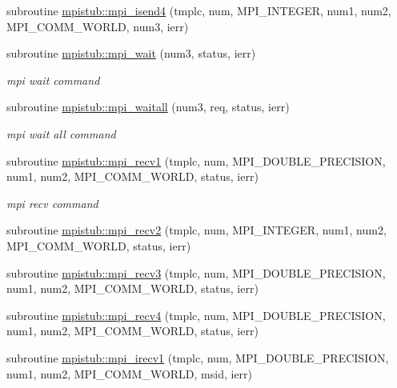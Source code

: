 \begin{DoxyCompactItemize}
\item 
subroutine \mbox{\hyperlink{namespacempistub_a4afba16e08f9475afade41e36b28333c}{mpistub\+::mpi\+\_\+isend4}} (tmplc, num, M\+P\+I\+\_\+\+I\+N\+T\+E\+G\+ER, num1, num2, M\+P\+I\+\_\+\+C\+O\+M\+M\+\_\+\+W\+O\+R\+LD, num3, ierr)
\item 
subroutine \mbox{\hyperlink{namespacempistub_abc6e6b54dd8f86227143dffe19e34fa4}{mpistub\+::mpi\+\_\+wait}} (num3, status, ierr)
\begin{DoxyCompactList}\small\item\em mpi wait command \end{DoxyCompactList}\item 
subroutine \mbox{\hyperlink{namespacempistub_ae67c78bda40eb1d1e4dbd6c69afc6201}{mpistub\+::mpi\+\_\+waitall}} (num3, req, status, ierr)
\begin{DoxyCompactList}\small\item\em mpi wait all command \end{DoxyCompactList}\item 
subroutine \mbox{\hyperlink{namespacempistub_a43bcd6e1779da1802197e44427742c2b}{mpistub\+::mpi\+\_\+recv1}} (tmplc, num, M\+P\+I\+\_\+\+D\+O\+U\+B\+L\+E\+\_\+\+P\+R\+E\+C\+I\+S\+I\+ON, num1, num2, M\+P\+I\+\_\+\+C\+O\+M\+M\+\_\+\+W\+O\+R\+LD, status, ierr)
\begin{DoxyCompactList}\small\item\em mpi recv command \end{DoxyCompactList}\item 
subroutine \mbox{\hyperlink{namespacempistub_a9936e4610ebb0c4c17e99d8a6d39e562}{mpistub\+::mpi\+\_\+recv2}} (tmplc, num, M\+P\+I\+\_\+\+I\+N\+T\+E\+G\+ER, num1, num2, M\+P\+I\+\_\+\+C\+O\+M\+M\+\_\+\+W\+O\+R\+LD, status, ierr)
\item 
subroutine \mbox{\hyperlink{namespacempistub_a86129a6bb6e924778df9e0c578f838d2}{mpistub\+::mpi\+\_\+recv3}} (tmplc, num, M\+P\+I\+\_\+\+D\+O\+U\+B\+L\+E\+\_\+\+P\+R\+E\+C\+I\+S\+I\+ON, num1, num2, M\+P\+I\+\_\+\+C\+O\+M\+M\+\_\+\+W\+O\+R\+LD, status, ierr)
\item 
subroutine \mbox{\hyperlink{namespacempistub_ab6b89c7d5ec60b643e3c939f926430c1}{mpistub\+::mpi\+\_\+recv4}} (tmplc, num, M\+P\+I\+\_\+\+D\+O\+U\+B\+L\+E\+\_\+\+P\+R\+E\+C\+I\+S\+I\+ON, num1, num2, M\+P\+I\+\_\+\+C\+O\+M\+M\+\_\+\+W\+O\+R\+LD, status, ierr)
\item 
subroutine \mbox{\hyperlink{namespacempistub_ada728226719e1870c85e45f6594cccbd}{mpistub\+::mpi\+\_\+irecv1}} (tmplc, num, M\+P\+I\+\_\+\+D\+O\+U\+B\+L\+E\+\_\+\+P\+R\+E\+C\+I\+S\+I\+ON, num1, num2, M\+P\+I\+\_\+\+C\+O\+M\+M\+\_\+\+W\+O\+R\+LD, msid, ierr)

\end{DoxyCompactItemize}
